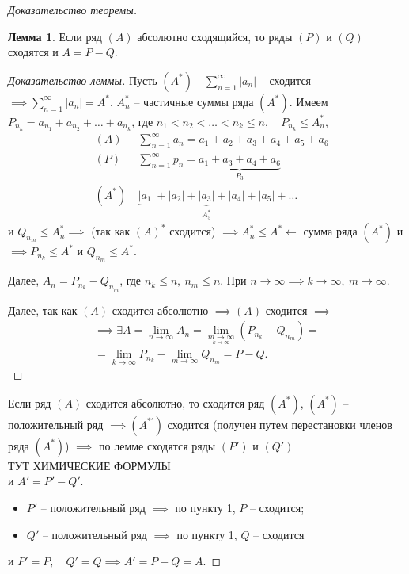 \documentclass{report}
\theoremstyle{definition}
\newtheorem{lemma}{Лемма}[section]
\begin{document}
\begin{proof}[Доказательство теоремы]
  \begin{lemma}
    Если ряд $(A)$ абсолютно сходящийся, то ряды $(P)$ и $(Q)$ сходятся и $A = P - Q$.
  \end{lemma}

  \begin{proof}[Доказательство леммы]
    Пусть $(A^*) \quad \sum_{n=1}^{\infty}|a_n|$ -- сходится $\implies \sum_{n=1}^{\infty}|a_n| = A^*$. $A_n^*$ -- частичные суммы ряда $(A^*)$. Имеем $P_{n_k} = a_{n_1} + a_{n_2} + \ldots + a_{n_k}$, где $n_1 < n_2 < \ldots < n_k \leqslant n, \quad P_{n_k} \leqslant A_n^*$,
    \begin{eqnarray*}
      & (A) & \ \sum_{n=1}^{\infty} a_n = a_1 + a_2 + a_3 + a_4 + a_5 + a_6 \\
      & (P) & \ \sum_{n=1}^{\infty} p_n = \underbrace{a_1 + a_3 + a_4 + a_6}_{P_3} \\
      & (A^*) & \ \underbrace{|a_1| + |a_2| + |a_3| + |a_4| + |a_5|}_{A_5^*} + \ldots
    \end{eqnarray*}
    и $Q_{n_m} \leqslant A_n^* \implies$ (так как $(A)^*$ сходится) $\implies A_n^* \leqslant A^* \leftarrow$ сумма ряда $(A^*)$ и $\implies P_{n_k}\leqslant A^*$ и $Q_{n_m} \leqslant A^*$.

    Далее, $A_n = P_{n_k} - Q_{n_m}$, где $n_k \leqslant n, \ n_m \leqslant n$. При $n\rightarrow\infty \implies k \rightarrow\infty, \ m \rightarrow\infty$.

    Далее, так как $(A)$ сходится абсолютно $\implies (A)$ сходится $\implies$
    \begin{multline*}
      \implies \exists A = \underset{n\rightarrow\infty}{\lim}A_n = \underset{\underset{k\rightarrow\infty}{m\rightarrow\infty}}{\lim}(P_{n_k} - Q_{n_m}) = \\
      = \underset{k\rightarrow\infty}{\lim}P_{n_k} - \underset{m\rightarrow\infty}{\lim}Q_{n_m} = P - Q.
    \end{multline*}
  \end{proof}

  Если ряд $(A)$ сходится абсолютно, то сходится ряд $(A^*)$, $(A^*)$ -- положительный ряд $\implies (A^{*'})$ сходится (получен путем перестановки членов ряда $(A^*)$) $\implies$ по лемме сходятся ряды $(P')$ и $(Q')$ \\

  {\Large ТУТ ХИМИЧЕСКИЕ ФОРМУЛЫ} \\

  и $A' = P' - Q'$.

  \begin{itemize}
    \item $P'$ -- положительный ряд $\implies$ по пункту 1, $P$ -- сходится;
    \item $Q'$ -- положительный ряд $\implies$ по пункту 1, $Q$ -- сходится
  \end{itemize}
  и $P' = P, \quad Q' = Q \implies A' = P - Q = A$.
\end{proof}
\end{document}
